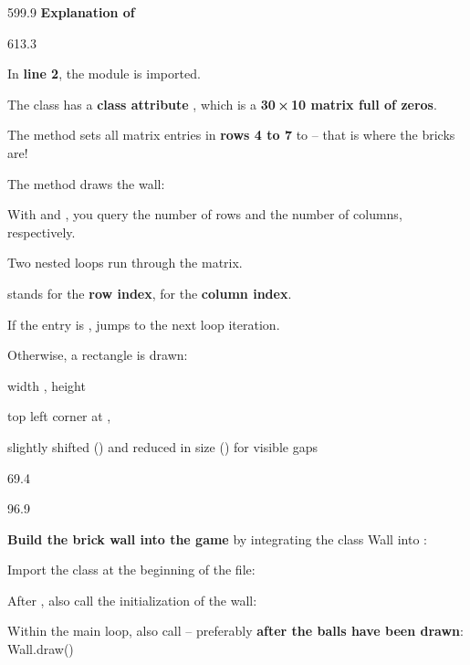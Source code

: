 \documentclass{aslab}
\newcommand*\codemd[1]{{\mdseries\codearg{#1}}}
\begin{document}
\begin{region}{599.9}
\textbf{Explanation of \codemd{wall.py}}
\end{region}

\begin{region}[pitch=13.65]{613.3}
\begin{dlist}
\item In \textbf{line 2}, the module  is imported.
\item The class has a \textbf{class attribute} , which is a
  \textbf{30\,×\,10 matrix full of zeros}.
\item The method  sets all matrix entries in \textbf{rows 4 to 7}
  to  -- that is where the bricks are!
\item The method  draws the wall:
  \begin{dlist}
  \item With  and , you
    query the number of rows and the number of columns, respectively.
  \item Two nested loops run through the matrix.
  \item {} stands for the \textbf{row index},  for the
    \textbf{column index}.
  \item If the entry is ,  jumps to the next loop
    iteration.
  \item Otherwise, a rectangle is drawn:
    \begin{dlist}
    \item width , height 
    \item top left corner at , 
    \item slightly shifted () and reduced in size () for
      visible gaps
    \end{dlist}
  \end{dlist}
\end{dlist}
\end{region}

\nextpage
\begin{region}{69.4}
\end{region}

\begin{region}[pitch=13.9]{96.9}
\begin{ntasks}
\item \textbf{Build the brick wall into the game} by integrating the class
  Wall into :
  \begin{alist}
  \item Import the class at the beginning of the file:
  \item After , also call the initialization of the wall:
  \item Within the main loop, also call  -- preferably
    \textbf{after the balls have been drawn}: Wall.draw()
  \end{alist}
\end{ntasks}
\end{region}
\end{document}

